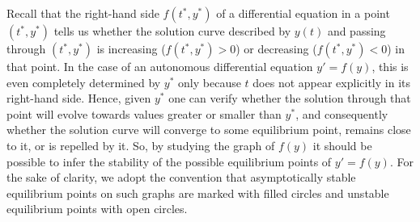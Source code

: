 Recall that the right-hand side $f\left(t^*,y^*\right)$ of a differential equation in a point $(t^*,y^*)$ tells us whether the solution curve described by $y(t)$ and passing through $(t^*,y^*)$ is increasing ($f\left(t^*,y^*\right)>0$) or decreasing ($f\left(t^*,y^*\right)<0$) in that point. In the case of an autonomous differential equation $y'=f(y)$, this is even completely determined by $y^*$ only because $t$ does not appear explicitly in its right-hand side. Hence, given $y^*$ one can verify whether the solution through that point will evolve towards values greater or smaller than $y^*$, and consequently whether the solution curve will converge to some equilibrium point, remains close to it, or is repelled by it. So, by studying the graph of $f(y)$ it should be possible to infer the stability of the possible equilibrium points of $y'=f(y)$. For the sake of clarity, we adopt the convention that asymptotically stable equilibrium points on such graphs are marked with filled circles and unstable equilibrium points with open circles.

